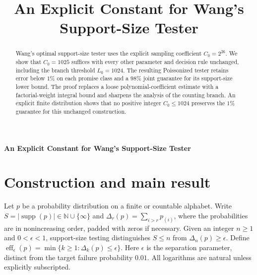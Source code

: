 \documentclass[10pt]{article}
\title{An Explicit Constant for Wang's Support-Size Tester}
\author{}
\date{}
\newcommand{\supp}{\operatorname{supp}}
\newcommand{\eff}{\operatorname{eff}}
\begin{document}
\begin{center}
{\Large\bfseries An Explicit Constant for Wang's Support-Size Tester\par}
\end{center}
\vspace{-0.5em}
\begin{abstract}
Wang's optimal support-size tester uses the explicit sampling coefficient
$C_0=2^{26}$. We show that $C_0=1025$ suffices with every other parameter
and decision rule unchanged, including the branch threshold $L_0=1024$.
The resulting Poissonized tester retains error below $1\%$ on each promise
class and a $98\%$ joint guarantee for its support-size lower bound.
The proof replaces a loose polynomial-coefficient estimate with a
factorial-weight integral bound and sharpens the analysis of the counting
branch. An explicit finite distribution shows that no positive integer
$C_0\le1024$ preserves the $1\%$ guarantee for this unchanged construction.
\end{abstract}

\section{Construction and main result}
Let $p$ be a probability distribution on a finite or countable alphabet.
Write $S=|\supp(p)|\in\mathbb N\cup\{\infty\}$ and
$\Delta_r(p)=\sum_{i>r}p_{(i)}$, where the probabilities are in nonincreasing
order, padded with zeros if necessary. Given an integer $n\ge1$ and
$0<\epsilon<1$, support-size testing distinguishes
$S\le n$ from $\Delta_n(p)\ge\epsilon$. Define
$\eff_\epsilon(p)=\min\{k\ge1:\Delta_k(p)\le\epsilon\}$.
Here $\epsilon$ is the separation parameter, distinct from the target
failure probability $0.01$.
All logarithms are natural unless explicitly subscripted.
\end{document}
